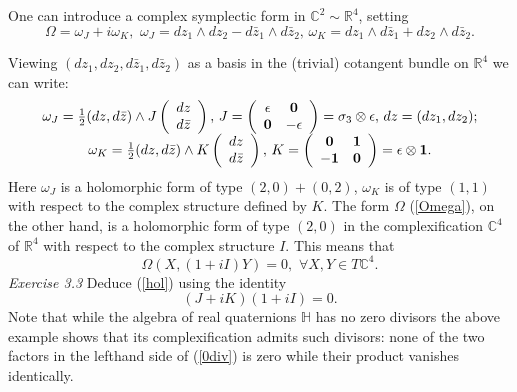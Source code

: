 \documentclass[12pt]{article}
\begin{document}
One can introduce a complex symplectic form in ${\mathbb C}^2 \sim{\mathbb R}^4$, setting
\begin{equation}
\label{Omega}
\Omega = \omega_J + i\omega_K, \, \, \omega_J = dz_1\wedge dz_2 - d{\bar z}_1\wedge d{\bar z}_2,
\, \omega_K = dz_1\wedge d{\bar z}_1 + dz_2\wedge d{\bar z}_2. 
\end{equation}

{ Viewing $(dz_1, dz_2, d{\bar z}_1, d{\bar z}_2)$ as a basis in the (trivial) cotangent bundle 
on ${\mathbb R}^4$ we can write:}
\begin{equation}
\label{JK}
\begin{array}{c}
\omega_J =\frac{1}{2} (dz, d{\bar z})\wedge J \left( 
\begin{array}{c}
dz \\ d{\bar z}
\end{array}
\right) ,
\, J =\left( 
\begin{array}{cc}
\epsilon & {\bf 0} \\
{\bf 0} & -\epsilon
\end{array}
\right) = \sigma_3 \otimes \epsilon, \, dz = (dz_1, dz_2);\\
 \omega_K =\frac{1}{2} (dz, d{\bar z})\wedge K \left( 
\begin{array}{c}
dz \\ d{\bar z}
\end{array}
\right) , \, K =\left( 
\begin{array}{cc}
{\bf 0} & {\bf 1} \\
-{\bf 1} & {\bf 0}
\end{array}
\right) = \epsilon \otimes {\bf 1}.
\end{array}
\end{equation}
Here $\omega_J$ is a holomorphic form of type $(2, 0) + (0,2)$, $\omega_K$ is of
 type $(1,1)$ with respect to the complex structure defined by $K$. The form 
$\Omega$ (\ref{Omega}), on the other hand, is a holomorphic form of type 
$(2, 0)$ in the complexification ${\mathbb C}^4$ of ${\mathbb R}^4$ with respect
 to the complex structure $I$. This means that 
\begin{equation}
\label{hol}
\Omega(X, (1+i I)Y) = 0,  \, \, \forall X, Y \in T{\mathbb C}^4.
\end{equation}
{\it Exercise 3.3} Deduce (\ref{hol}) using the identity
\begin{equation}
\label{0div}
(J + i K)(1 + i I) = 0.
\end{equation}
Note that while the algebra of real quaternions $\mathbb H$
has no zero divisors the above example shows that its complexification admits
such divisors: none of the two factors in the lefthand side of (\ref{0div}) is 
zero while their product vanishes identically.
\end{document}
